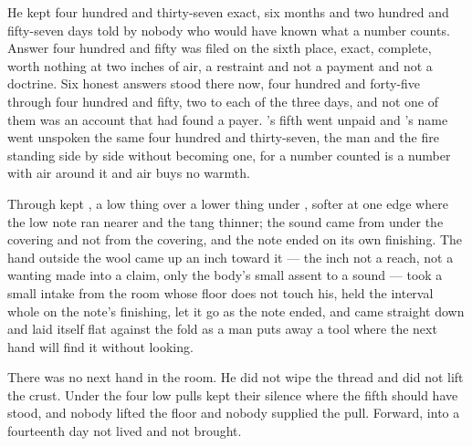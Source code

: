 He kept four hundred and thirty-seven exact, six months and two hundred and fifty-seven days told by nobody who would have known what a number counts. Answer four hundred and fifty was filed on the sixth place, exact, complete, worth nothing at two inches of air, a restraint and not a payment and not a doctrine. Six honest answers stood there now, four hundred and forty-five through four hundred and fifty, two to each of the three days, and not one of them was an account that had found a payer. 's fifth went unpaid and 's name went unspoken the same four hundred and thirty-seven, the man and the fire standing side by side without becoming one, for a number counted is a number with air around it and air buys no warmth.

Through   kept , a low thing over a lower thing under , softer at one edge where the low note ran nearer and the tang thinner; the sound came from under the covering and not from the covering, and the note ended on its own finishing. The hand outside the wool came up an inch toward it --- the inch not a reach, not a wanting made into a claim, only the body's small assent to a sound --- took a small intake from the room whose floor does not touch his, held the interval whole on the note's finishing, let it go as the note ended, and came straight down and laid itself flat against the fold as a man puts away a tool where the next hand will find it without looking.

There was no next hand in the room. He did not wipe the thread and did not lift the crust. Under  the four low pulls kept their silence where the fifth should have stood, and nobody lifted the floor and nobody supplied the pull. Forward, into a fourteenth day not lived and not brought.

